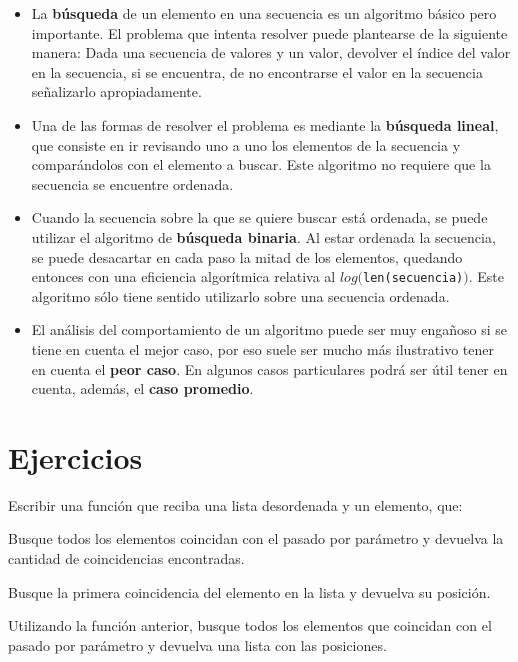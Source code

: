 \begin{itemize}

\item La {\bf búsqueda} de un elemento en una secuencia es un
algoritmo básico pero importante. El problema que intenta resolver puede
plantearse de la siguiente manera: Dada una secuencia de valores y un
valor, devolver el índice del valor en la secuencia, si se encuentra, de no
encontrarse el valor en la secuencia señalizarlo apropiadamente.

\item Una de las formas de resolver el problema es mediante la {\bf
búsqueda lineal}, que consiste en ir revisando uno a uno los elementos de
la secuencia y comparándolos con el elemento a buscar.  Este algoritmo no
requiere que la secuencia se encuentre ordenada.

\item Cuando la secuencia sobre la que se quiere buscar está ordenada, se
puede utilizar el algoritmo de {\bf búsqueda binaria}.  Al estar ordenada
la secuencia, se puede desacartar en cada paso la mitad de los elementos,
quedando entonces con una eficiencia algorítmica relativa al
$log($\lstinline!len(secuencia)!$)$. Este algoritmo sólo tiene sentido
utilizarlo sobre una secuencia ordenada.

\item El análisis del comportamiento de un algoritmo puede ser muy engañoso
si se tiene en cuenta el mejor caso, por eso suele ser mucho más
ilustrativo tener en cuenta el {\bf peor caso}.  En algunos casos
particulares podrá ser útil tener en cuenta, además, el {\bf caso
promedio}.
\end{itemize}


\newpage
\section{Ejercicios}

\begin{ejercicio}
Escribir una función que reciba una lista desordenada y un elemento, que:
\begin{partes}
\item Busque todos los elementos coincidan con el pasado por parámetro y
devuelva la cantidad de coincidencias encontradas.
\item Busque la primera coincidencia del elemento en la lista y devuelva su
posición.
\item Utilizando la función anterior, busque todos los elementos que coincidan
con el pasado por parámetro y devuelva una lista con las posiciones.
\end{partes}
\end{ejercicio}


